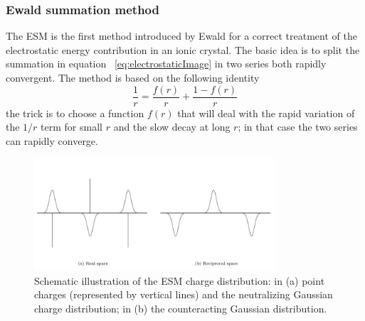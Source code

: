 \subsubsection{Ewald summation method} %
The \acf{ESM} is the first method introduced by Ewald for a correct treatment of the electrostatic energy
contribution in an ionic crystal. The basic idea is to split the summation in equation~
\eqref{eq:electrostaticImage} in two series both rapidly convergent. The method is based on the following identity
\begin{equation}
	\frac{1}{r} = \frac{f(r)}{r} + \frac{1 - f(r)}{r}
	\label{eq:ewaldTrick}
\end{equation}
the trick is to choose a function $f(r)$ that will deal with the rapid variation of the $1/r$ term for small $r$
and the slow decay at long $r$; in that case the two series can rapidly converge.
\begin{figure}[!ht]
	\centering
	\includegraphics[width=0.8\textwidth]{./img/EwaldSum/EwaldSum}
	\caption{Schematic illustration of the \acs{ESM} charge distribution: in (a) point charges (represented by vertical lines) and the neutralizing Gaussian charge distribution; in (b) the counteracting Gaussian distribution.}
	\label{fig:ewald}
\end{figure}

